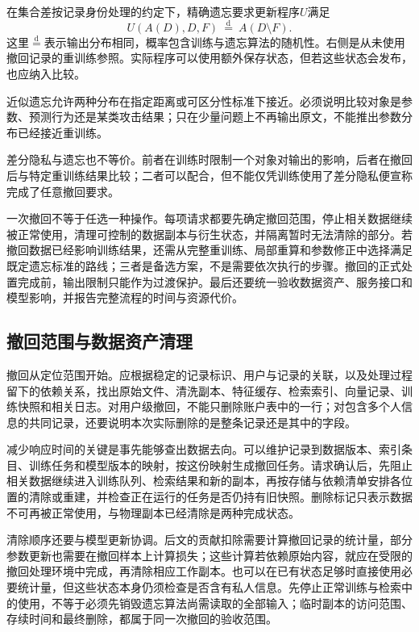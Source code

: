 在集合差按记录身份处理的约定下，精确遗忘要求更新程序$U$满足
\begin{equation}
 U(A(D),D,F)\ \overset{\mathrm d}{=}\ A(D\setminus F).
 \label{eq:privacy-exact-unlearning}
\end{equation}
这里$\overset{\mathrm d}{=}$表示输出分布相同，概率包含训练与遗忘算法的随机性。右侧是从未使用撤回记录的重训练参照。实际程序可以使用额外保存状态，但若这些状态会发布，也应纳入比较。

近似遗忘允许两种分布在指定距离或可区分性标准下接近。必须说明比较对象是参数、预测行为还是某类攻击结果；只在少量问题上不再输出原文，不能推出参数分布已经接近重训练。

差分隐私与遗忘也不等价。前者在训练时限制一个对象对输出的影响，后者在撤回后与特定重训练结果比较；二者可以配合，但不能仅凭训练使用了差分隐私便宣称完成了任意撤回要求。

一次撤回不等于任选一种操作。每项请求都要先确定撤回范围，停止相关数据继续被正常使用，清理可控制的数据副本与衍生状态，并隔离暂时无法清除的部分。若撤回数据已经影响训练结果，还需从完整重训练、局部重算和参数修正中选择满足既定遗忘标准的路线；三者是备选方案，不是需要依次执行的步骤。撤回的正式处置完成前，输出限制只能作为过渡保护。最后还要统一验收数据资产、服务接口和模型影响，并报告完整流程的时间与资源代价。

\subsection{撤回范围与数据资产清理}
\label{sec:privacy-asset-deletion}

撤回从定位范围开始。应根据稳定的记录标识、用户与记录的关联，以及处理过程留下的依赖关系，找出原始文件、清洗副本、特征缓存、检索索引、向量记录、训练快照和相关日志。对用户级撤回，不能只删除账户表中的一行；对包含多个人信息的共同记录，还要说明本次实际删除的是整条记录还是其中的字段。

减少响应时间的关键是事先能够查出数据去向。可以维护记录到数据版本、索引条目、训练任务和模型版本的映射，按这份映射生成撤回任务。请求确认后，先阻止相关数据继续进入训练队列、检索结果和新的副本，再按存储与依赖清单安排各位置的清除或重建，并检查正在运行的任务是否仍持有旧快照。删除标记只表示数据不可再被正常使用，与物理副本已经清除是两种完成状态。

清除顺序还要与模型更新协调。后文的贡献扣除需要计算撤回记录的统计量，部分参数更新也需要在撤回样本上计算损失；这些计算若依赖原始内容，就应在受限的撤回处理环境中完成，再清除相应工作副本。也可以在已有状态足够时直接使用必要统计量，但这些状态本身仍须检查是否含有私人信息。先停止正常训练与检索中的使用，不等于必须先销毁遗忘算法尚需读取的全部输入；临时副本的访问范围、存续时间和最终删除，都属于同一次撤回的验收范围。

